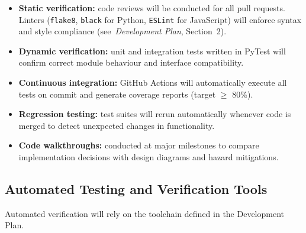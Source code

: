 \documentclass[12pt, titlepage]{article}
\begin{document}
\begin{itemize}
  \item \textbf{Static verification:} code reviews will be conducted for all pull
  requests. Linters (\texttt{flake8}, \texttt{black} for Python, \texttt{ESLint}
  for JavaScript) will enforce syntax and style compliance
  (see~\textit{Development Plan}, Section~2).

  \item \textbf{Dynamic verification:} unit and integration tests written in
  PyTest will confirm correct module behaviour and interface compatibility.

  \item \textbf{Continuous integration:} GitHub Actions will automatically
  execute all tests on commit and generate coverage reports (target $\geq$ 80\%).

  \item \textbf{Regression testing:} test suites will rerun automatically whenever
  code is merged to detect unexpected changes in functionality.

  \item \textbf{Code walkthroughs:} conducted at major milestones to compare
  implementation decisions with design diagrams and hazard mitigations.
\end{itemize}

\subsection{Automated Testing and Verification Tools}
\label{subsec:testing-tools}


Automated verification will rely on the toolchain defined in the Development
Plan.
\end{document}

